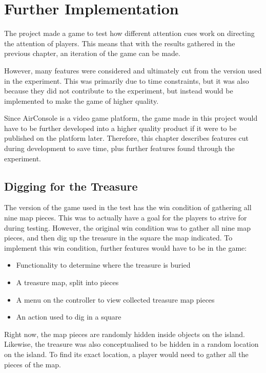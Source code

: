 \chapter{Further Implementation}\label{ch:further_implementation}
The project made a game to test how different attention cues work on directing the attention of players. This means that with the results gathered in the previous chapter, an iteration of the game can be made.

However, many features were considered and ultimately cut from the version used in the experiment. This was primarily due to time constraints, but it was also because they did not contribute to the experiment, but instead would be implemented to make the game of higher quality.

Since AirConsole is a video game platform, the game made in this project would have to be further developed into a higher quality product if it were to be published on the platform later. Therefore, this chapter describes features cut during development to save time, plus further features found through the experiment.

\section{Digging for the Treasure}
The version of the game used in the test has the win condition of gathering all nine map pieces. This was to actually have a goal for the players to strive for during testing.
However, the original win condition was to gather all nine map pieces, and then dig up the treasure in the square the map indicated. To implement this win condition, further features would have to be in the game:
\begin{itemize}
\item Functionality to determine where the treasure is buried
\item A treasure map, split into pieces
\item A menu on the controller to view collected treasure map pieces
\item An action used to dig in a square
\end{itemize}

Right now, the map pieces are randomly hidden inside objects on the island. Likewise, the treasure was also conceptualised to be hidden in a random location on the island. To find its exact location, a player would need to gather all the pieces of the map. 